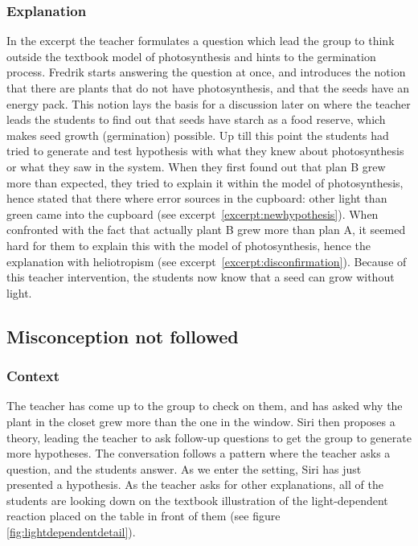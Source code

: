 \subsubsection*{Explanation}
In the excerpt the teacher formulates a question which lead the group to think outside the textbook model of photosynthesis and hints to the germination process. Fredrik starts answering the question at once, and introduces the notion that there are plants that do not have photosynthesis, and that the seeds have an energy pack. This notion lays the basis for a discussion later on where the teacher leads the students to find out that seeds have starch as a food reserve, which makes seed growth (germination) possible. Up till this point the students had tried to generate and test hypothesis with what they knew about photosynthesis or what they saw in the system. When they first found out that plan B grew more than expected, they tried to explain it within the model of photosynthesis, hence stated that there where error sources in the cupboard: other light than green came into the cupboard (see excerpt~\ref{excerpt:newhypothesis}). When confronted with the fact that actually plant B grew more than plan A, it seemed hard for them to explain this with the model of photosynthesis, hence the explanation with heliotropism (see excerpt~\ref{excerpt:disconfirmation}). Because of this teacher intervention, the students now know that a seed can grow without light.


\subsection{Misconception not followed}

\subsubsection*{Context}
The teacher has come up to the group to check on them, and has asked why the plant in the closet grew more than the one in the window. Siri then proposes a theory, leading the teacher to ask follow-up questions to get the group to generate more hypotheses. The conversation follows a pattern where the teacher asks a question, and the students answer. As we enter the setting, Siri has just presented a hypothesis. As the teacher asks for other explanations, all of the students are looking down on the textbook illustration of the light-dependent reaction placed on the table in front of them (see figure \ref{fig:lightdependentdetail}). 


